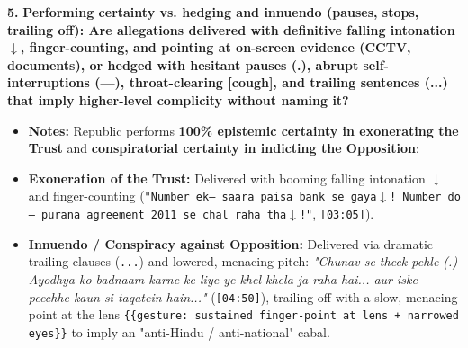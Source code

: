 \documentclass[10pt,a4paper]{article}
\begin{document}
\noindent\textbf{5.} \textbf{Performing certainty vs. hedging and innuendo (pauses, stops, trailing off): Are allegations delivered with definitive falling intonation $\downarrow$, finger-counting, and pointing at on-screen evidence (CCTV, documents), or hedged with hesitant pauses (.), abrupt self-interruptions (---), throat-clearing [cough], and trailing sentences (...) that imply higher-level complicity without naming it?}\par\smallskip
\begin{itemize}
  \item \textbf{Notes:}
Republic performs \textbf{100\% epistemic certainty in exonerating the Trust} and \textbf{conspiratorial certainty in indicting the Opposition}:\par\smallskip
  \item \textbf{Exoneration of the Trust:} Delivered with booming falling intonation \texttt{$\downarrow$} and finger-counting (\texttt{"Number ek--- saara paisa bank se gaya$\downarrow$! Number do--- purana agreement 2011 se chal raha tha$\downarrow$!"}, \texttt{[03:05]}).
  \item \textbf{Innuendo / Conspiracy against Opposition:} Delivered via dramatic trailing clauses (\texttt{...}) and lowered, menacing pitch: \textit{"Chunav se theek pehle (.) Ayodhya ko badnaam karne ke liye ye khel khela ja raha hai... aur iske peechhe kaun si taqatein hain..."} (\texttt{[04:50]}), trailing off with a slow, menacing point at the lens \texttt{\{\{gesture: sustained finger-point at lens + narrowed eyes\}\}} to imply an "anti-Hindu / anti-national" cabal.
\end{itemize}
\end{document}
